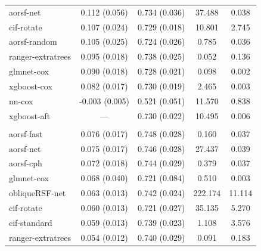 \documentclass[twoside,11pt]{article}\usepackage[]{graphicx}\usepackage[]{xcolor}
\newenvironment{knitrout}{}{} %
\begin{document}
\begin{knitrout}
\begin{longtable}[t]{lcccc}
\hspace{1em}aorsf-net & 0.112 (0.056) & 0.734 (0.036) & 37.488 & 0.038\\
\hspace{1em}cif-rotate & 0.107 (0.024) & 0.729 (0.018) & 10.801 & 2.745\\
\hspace{1em}aorsf-random & 0.105 (0.025) & 0.724 (0.026) & 0.785 & 0.036\\
\hspace{1em}ranger-extratrees & 0.095 (0.018) & 0.738 (0.025) & 0.052 & 0.136\\
\hspace{1em}glmnet-cox & 0.090 (0.018) & 0.728 (0.021) & 0.098 & 0.002\\
\hspace{1em}xgboost-cox & 0.082 (0.017) & 0.730 (0.019) & 2.465 & 0.003\\
\hspace{1em}nn-cox & -0.003 (0.005) & 0.521 (0.051) & 11.570 & 0.838\\
\hspace{1em}xgboost-aft & --- & 0.730 (0.022) & 10.495 & 0.006\\
\addlinespace[0.3em]
\multicolumn{5}{l}{\textit{\textbf{GUIDE-IT; CVD death, n = 894, p = 59}}}\\
\hline
\hspace{1em}aorsf-fast & 0.076 (0.017) & 0.748 (0.028) & 0.160 & 0.037\\
\hspace{1em}aorsf-net & 0.075 (0.017) & 0.746 (0.028) & 27.437 & 0.039\\
\hspace{1em}aorsf-cph & 0.072 (0.018) & 0.744 (0.029) & 0.379 & 0.037\\
\hspace{1em}glmnet-cox & 0.068 (0.040) & 0.721 (0.084) & 0.510 & 0.003\\
\hspace{1em}obliqueRSF-net & 0.063 (0.013) & 0.742 (0.024) & 222.174 & 11.114\\
\hspace{1em}cif-rotate & 0.060 (0.013) & 0.721 (0.027) & 35.135 & 5.270\\
\hspace{1em}cif-standard & 0.059 (0.013) & 0.739 (0.023) & 1.108 & 3.576\\
\hspace{1em}ranger-extratrees & 0.054 (0.012) & 0.740 (0.029) & 0.091 & 0.183\\

\end{longtable}
\end{knitrout}
\end{document}
